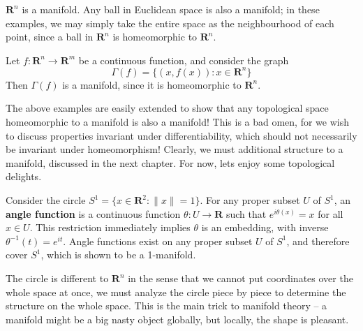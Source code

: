 \begin{example}
    $\mathbf{R}^n$ is a manifold. Any ball in Euclidean space is also a manifold; in these examples, we may simply take the entire space as the neighbourhood of each point, since a ball in $\mathbf{R}^n$ is homeomorphic to $\mathbf{R}^n$.
\end{example}

\begin{example}
    Let $f: \mathbf{R}^n \to \mathbf{R}^m$ be a continuous function, and consider the graph
    \[ \Gamma(f) = \{ (x, f(x)) : x \in \mathbf{R}^n \} \]
    Then $\Gamma(f)$ is a manifold, since it is homeomorphic to $\mathbf{R}^n$.
\end{example}

The above examples are easily extended to show that any topological space homeomorphic to a manifold is also a manifold! This is a bad omen, for we wish to discuss properties invariant under differentiability, which should not necessarily be invariant under homeomorphism! Clearly, we must additional structure to a manifold, discussed in the next chapter. For now, lets enjoy some topological delights.

\begin{example}
    Consider the circle $S^1 = \{ x \in \mathbf{R}^2 : \|x\| = 1 \}$. For any proper subset $U$ of $S^1$, an {\bf angle function} is a continuous function $\theta:U \to \mathbf{R}$ such that $e^{i\theta(x)} = x$ for all $x \in U$. This restriction immediately implies $\theta$ is an embedding, with inverse $\theta^{-1}(t) = e^{it}$. Angle functions exist on any proper subset $U$ of $S^1$, and therefore cover $S^1$, which is shown to be a 1-manifold.
\end{example}

The circle is different to $\mathbf{R}^n$ in the sense that we cannot put coordinates over the whole space at once, we must analyze the circle piece by piece to determine the structure on the whole space. This is the main trick to manifold theory -- a manifold might be a big nasty object globally, but locally, the shape is pleasant.

